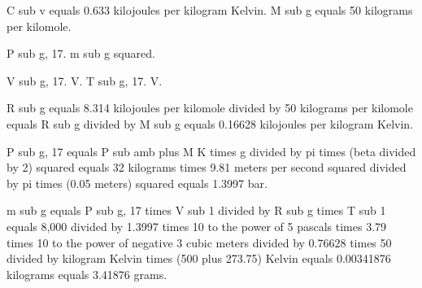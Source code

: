 C sub v equals 0.633 kilojoules per kilogram Kelvin. M sub g equals 50 kilograms per kilomole.

P sub g, 17. m sub g squared.

V sub g, 17. V. T sub g, 17. V.

R sub g equals 8.314 kilojoules per kilomole divided by 50 kilograms per kilomole equals R sub g divided by M sub g equals 0.16628 kilojoules per kilogram Kelvin.

P sub g, 17 equals P sub amb plus M K times g divided by pi times (beta divided by 2) squared equals 32 kilograms times 9.81 meters per second squared divided by pi times (0.05 meters) squared equals 1.3997 bar.

m sub g equals P sub g, 17 times V sub 1 divided by R sub g times T sub 1 equals 8,000 divided by 1.3997 times 10 to the power of 5 pascals times 3.79 times 10 to the power of negative 3 cubic meters divided by 0.76628 times 50 divided by kilogram Kelvin times (500 plus 273.75) Kelvin equals 0.00341876 kilograms equals 3.41876 grams.